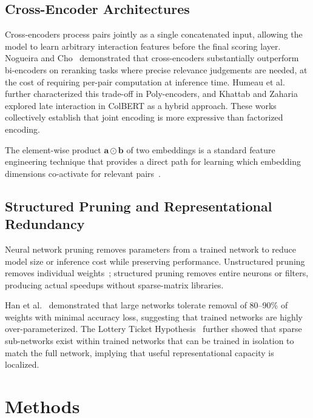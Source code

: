 \documentclass[journal]{IEEEtran}
\begin{document}
\subsection{Cross-Encoder Architectures}

Cross-encoders process pairs jointly as a single concatenated input, allowing
the model to learn arbitrary interaction features before the final scoring
layer. Nogueira and Cho~\cite{nogueira2019} demonstrated that cross-encoders
substantially outperform bi-encoders on reranking tasks where precise
relevance judgements are needed, at the cost of requiring per-pair computation
at inference time. Humeau et al.~\cite{humeau2020} further characterized this
trade-off in Poly-encoders, and Khattab and Zaharia~\cite{khattab2020}
explored late interaction in ColBERT as a hybrid approach. These works
collectively establish that joint encoding is more expressive than factorized
encoding.

The element-wise product $\mathbf{a} \odot \mathbf{b}$ of two embeddings is
a standard feature engineering technique that provides a direct path for
learning which embedding dimensions co-activate for relevant
pairs~\cite{rendle2010}.

\subsection{Structured Pruning and Representational Redundancy}

Neural network pruning removes parameters from a trained network to reduce
model size or inference cost while preserving performance. Unstructured pruning
removes individual weights~\cite{han2015}; structured pruning removes entire
neurons or filters, producing actual speedups without sparse-matrix libraries.

Han et al.~\cite{han2015} demonstrated that large networks tolerate removal
of 80--90\% of weights with minimal accuracy loss, suggesting that trained
networks are highly over-parameterized. The Lottery Ticket
Hypothesis~\cite{frankle2019} further showed that sparse sub-networks exist
within trained networks that can be trained in isolation to match the full
network, implying that useful representational capacity is localized.

\section{Methods}
\label{sec:methods}
\end{document}
